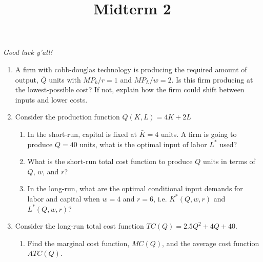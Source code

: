 \documentclass[11pt]{article}
\title{Midterm 2}
\newcommand{\answer}[1]{\iftoggle{INCLUDEANSWERS}{{\color{violet!70!white}\textbf{Solution:} #1}}{} }
\newcommand{\points}[1]{\iftoggle{INCLUDEPOINTS}{{\color{blue!70!white}(#1 pts.)}}{}}
\begin{document}
  
\emph{Good luck y'all!}

\begin{enumerate}
  \item \points{10} A firm with cobb-douglas technology is producing the required amount of output, $\bar{Q}$ units with $MP_k / r = 1$ and $MP_L / w = 2$. Is this firm producing at the lowest-possible cost? If not, explain how the firm could shift between inputs and lower costs.
  
  \answer{
    In this setting, firms should shift inputs toward labor and away from capital since \$1 spent on labor produces more output than \$1 spent on capital. The firm could keep output constant and save money by shifting towards labor.
  }

  \item Consider the production function $Q(K, L) = 4K + 2L$
  \begin{enumerate}
    \item \points{5} In the short-run, capital is fixed at $\bar{K} = 4$ units. A firm is going to produce $Q = 40$ units, what is the optimal input of labor $L^*$ used?
    
    \item \points{10} What is the short-run total cost function to produce $Q$ units in terms of $Q$, $w$, and $r$?
    
    \item \points{10} In the long-run, what are the optimal conditional input demands for labor and capital when $w = 4$ and $r = 6$, i.e. $K^*(Q, w, r)$ and $L^*(Q, w, r)$?
  \end{enumerate}

  \answer{
    \begin{enumerate}
      \item $40 = 4 * \bar{K} + 2L = 16 + 2L \implies L^* = 12$
      
      \item $Q = 16 + 2L \implies L^*(Q) = Q/2 - 8$.
      
      Therefore, the short-run total cost is $SRTC(Q) = r*4 + w*(Q/2 - 8)$

      \item $MP_K/r = 4/6 = 2/3$ and $MP_L/w = 2/4 = 1/2$. Therefore, $L^*(Q, w, r) = 0$ since the marignal product per dollar for capital is larger. $Q = 4K \implies K^*(Q, w, r) = Q/4$.
    \end{enumerate}
  }

  \item Consider the long-run total cost function $TC(Q) = 2.5Q^2 + 4Q + 40$.
  \begin{enumerate}
    \item \points{5} Find the marginal cost function, $MC(Q)$, and the average cost function $ATC(Q)$.
    

\end{enumerate}
\end{enumerate}
\end{document}
